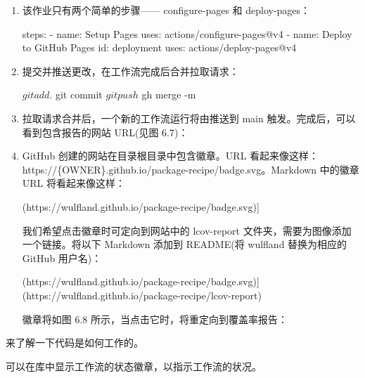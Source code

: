 \begin{enumerate}
\item 
该作业只有两个简单的步骤—— configure-pages 和 deploy-pages：

\begin{shell}
steps:
  - name: Setup Pages
    uses: actions/configure-pages@v4
  - name: Deploy to GitHub Pages
    id: deployment
    uses: actions/deploy-pages@v4
\end{shell}

\item 
提交并推送更改，在工作流完成后合并拉取请求：

\begin{shell}
$ git add .
$ git commit
$ git push
$ gh merge -m
\end{shell}

\item 
拉取请求合并后，一个新的工作流运行将由推送到 main 触发。完成后，可以看到包含报告的网站 URL(见图 6.7)：


\item 
GitHub 创建的网站在目录根目录中包含徽章。URL 看起来像这样：https://\{OWNER\}.github.io/package-recipe/badge.svg。Markdown 中的徽章 URL 将看起来像这样：

\begin{shell}
[![Coverage](https://wulfland.github.io/package-recipe/badge.svg)]
\end{shell}

我们希望点击徽章时可定向到网站中的 lcov-report 文件夹，需要为图像添加一个链接。将以下 Markdown 添加到 README(将 wulfland 替换为相应的 GitHub 用户名)：

\begin{shell}
[![Coverage](https://wulfland.github.io/package-recipe/badge.svg)] (https://wulfland.github.io/package-recipe/lcov-report)
\end{shell}

徽章将如图 6.8 所示，当点击它时，将重定向到覆盖率报告：

  
\end{enumerate}


来了解一下代码是如何工作的。


可以在库中显示工作流的状态徽章，以指示工作流的状况。

